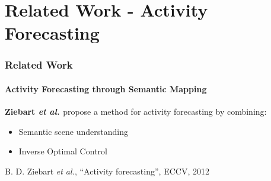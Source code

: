 \section{Related Work - Activity Forecasting}

\begin{frame}
	\frametitle{Related Work}
	\framesubtitle{Activity Forecasting through Semantic Mapping}
	
	\vspace{0.33cm}
	
	\large
	
	\textbf{Ziebart \emph{et al.} \cite{Kitani12}} propose a method for activity forecasting by
	combining:
	
	\begin{itemize}
		\item Semantic scene understanding
		\vspace{0.05cm}
		\item Inverse Optimal Control
	\end{itemize}
	
	\vspace{-0.2cm}
	
	\begin{center}
	\end{center}
	
	\vspace{-0.3cm}
	
	\tiny
	
	\cite{Kitani12} B. D. Ziebart \emph{et al.}, ``Activity forecasting'', ECCV, 2012
\end{frame}

